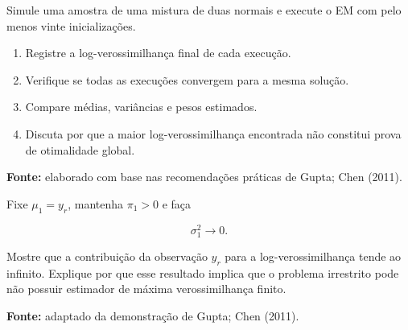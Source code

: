 \documentclass[
  letterpaper,
  DIV=11,
  numbers=noendperiod]{scrreprt}
\providecommand{\tightlist}{%
  \setlength{\itemsep}{0pt}\setlength{\parskip}{0pt}}\usepackage{longtable,booktabs,array}
\begin{document}
\begin{tcolorbox}[enhanced jigsaw, colback=white, leftrule=.75mm, colbacktitle=quarto-callout-note-color!10!white, breakable, titlerule=0mm, bottomtitle=1mm, title=\textcolor{quarto-callout-note-color}{\faInfo}\hspace{0.5em}{Exercício 7 --- inicializações múltiplas}, colframe=quarto-callout-note-color-frame, toprule=.15mm, opacityback=0, bottomrule=.15mm, opacitybacktitle=0.6, arc=.35mm, toptitle=1mm, rightrule=.15mm, coltitle=black, left=2mm]

Simule uma amostra de uma mistura de duas normais e execute o EM com
pelo menos vinte inicializações.

\begin{enumerate}
\def\labelenumi{\arabic{enumi}.}
\tightlist
\item
  Registre a log-verossimilhança final de cada execução.
\item
  Verifique se todas as execuções convergem para a mesma solução.
\item
  Compare médias, variâncias e pesos estimados.
\item
  Discuta por que a maior log-verossimilhança encontrada não constitui
  prova de otimalidade global.
\end{enumerate}

\textbf{Fonte:} elaborado com base nas recomendações práticas de Gupta;
Chen (2011).

\end{tcolorbox}

\begin{tcolorbox}[enhanced jigsaw, colback=white, leftrule=.75mm, colbacktitle=quarto-callout-note-color!10!white, breakable, titlerule=0mm, bottomtitle=1mm, title=\textcolor{quarto-callout-note-color}{\faInfo}\hspace{0.5em}{Exercício 8 --- singularidade em misturas gaussianas}, colframe=quarto-callout-note-color-frame, toprule=.15mm, opacityback=0, bottomrule=.15mm, opacitybacktitle=0.6, arc=.35mm, toptitle=1mm, rightrule=.15mm, coltitle=black, left=2mm]

Fixe \(\mu_1=y_r\), mantenha \(\pi_1>0\) e faça

\[\sigma_1^2\longrightarrow 0.\]

Mostre que a contribuição da observação \(y_r\) para a
log-verossimilhança tende ao infinito. Explique por que esse resultado
implica que o problema irrestrito pode não possuir estimador de máxima
verossimilhança finito.

\textbf{Fonte:} adaptado da demonstração de Gupta; Chen (2011).

\end{tcolorbox}
\end{document}
